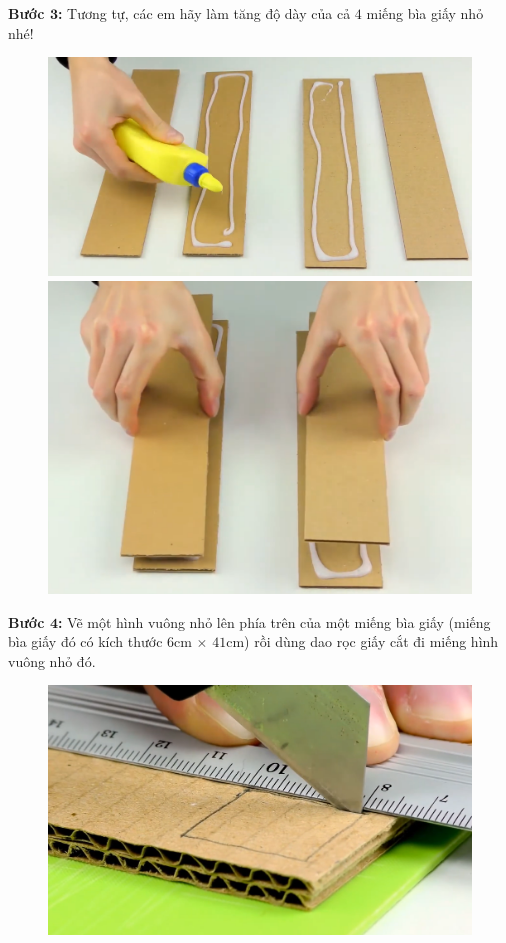 \begin{multicols}{2}
\begin{figure}[H]
		\vspace*{-10pt}
	\end{figure}
	\textbf{\color{toancuabi}Bước $\pmb{3}$:} Tương tự, các em hãy làm tăng độ dày của cả $4$ miếng bìa giấy nhỏ nhé!
	\begin{figure}[H]
		\vspace*{5pt}
		\centering
		\captionsetup{labelformat= empty, justification=centering}
		\includegraphics[width= 0.9\linewidth]{4}
		\includegraphics[width= 0.9\linewidth]{5}
		\vspace*{-10pt}
	\end{figure}
	\textbf{\color{toancuabi}Bước $\pmb{4}$:} Vẽ một hình vuông nhỏ lên phía trên của một miếng bìa giấy (miếng bìa giấy đó có kích thước $6$cm $\times$ $41$cm) rồi dùng dao rọc giấy cắt đi miếng hình vuông nhỏ đó. 
	\begin{figure}[H]
		\vspace*{-5pt}
		\centering
		\captionsetup{labelformat= empty, justification=centering}
		\includegraphics[width= 0.9\linewidth]{6}

\end{figure}
\end{multicols}
